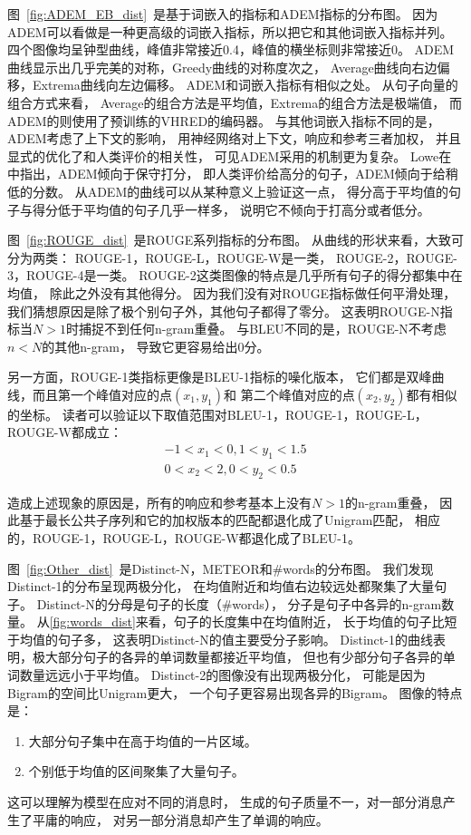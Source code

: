 
图~\ref{fig:ADEM_EB_dist}~是基于词嵌入的指标和ADEM指标的分布图。
因为ADEM可以看做是一种更高级的词嵌入指标，所以把它和其他词嵌入指标并列。
四个图像均呈钟型曲线，峰值非常接近0.4，峰值的横坐标则非常接近0。
ADEM曲线显示出几乎完美的对称，Greedy曲线的对称度次之，
Average曲线向右边偏移，Extrema曲线向左边偏移。
ADEM和词嵌入指标有相似之处。
从句子向量的组合方式来看，
Average的组合方法是平均值，Extrema的组合方法是极端值，
而ADEM的则使用了预训练的VHRED的编码器。
与其他词嵌入指标不同的是，ADEM考虑了上下文的影响，
用神经网络对上下文，响应和参考三者加权，
并且显式的优化了和人类评价的相关性，
可见ADEM采用的机制更为复杂。
Lowe在\cite{ADEM}中指出，ADEM倾向于保守打分，
即人类评价给高分的句子，ADEM倾向于给稍低的分数。
从ADEM的曲线可以从某种意义上验证这一点，
得分高于平均值的句子与得分低于平均值的句子几乎一样多，
说明它不倾向于打高分或者低分。


图~\ref{fig:ROUGE_dist}~是ROUGE系列指标的分布图。
从曲线的形状来看，大致可分为两类：
ROUGE-1，ROUGE-L，ROUGE-W是一类，
ROUGE-2，ROUGE-3，ROUGE-4是一类。
ROUGE-2这类图像的特点是几乎所有句子的得分都集中在均值，
除此之外没有其他得分。
因为我们没有对ROUGE指标做任何平滑处理，
我们猜想原因是除了极个别句子外，其他句子都得了零分。
这表明ROUGE-N指标当$N > 1$时捕捉不到任何n-gram重叠。
与BLEU不同的是，ROUGE-N不考虑$n < N$的其他n-gram，
导致它更容易给出0分。

另一方面，ROUGE-1类指标更像是BLEU-1指标的噪化版本，
它们都是双峰曲线，而且第一个峰值对应的点$(x_1, y_1)$和
第二个峰值对应的点$(x_2, y_2)$都有相似的坐标。
读者可以验证以下取值范围对BLEU-1，ROUGE-1，ROUGE-L，ROUGE-W都成立：
\begin{align}
    -1 < x_1 < 0, 1 < y_1 < 1.5 \\
    0 < x_2 < 2, 0 < y_2 < 0.5
\end{align}

造成上述现象的原因是，所有的响应和参考基本上没有$N > 1$的n-gram重叠，
因此基于最长公共子序列和它的加权版本的匹配都退化成了Unigram匹配，
相应的，ROUGE-1，ROUGE-L，ROUGE-W都退化成了BLEU-1。


图~\ref{fig:Other_dist}~是Distinct-N，METEOR和\#words的分布图。
我们发现Distinct-1的分布呈现两极分化，
在均值附近和均值右边较远处都聚集了大量句子。
Distinct-N的分母是句子的长度（\#words），
分子是句子中各异的n-gram数量。
从\ref{fig:words_dist}来看，句子的长度集中在均值附近，
长于均值的句子比短于均值的句子多，
这表明Distinct-N的值主要受分子影响。
Distinct-1的曲线表明，极大部分句子的各异的单词数量都接近平均值，
但也有少部分句子各异的单词数量远远小于平均值。
Distinct-2的图像没有出现两极分化，
可能是因为Bigram的空间比Unigram更大，
一个句子更容易出现各异的Bigram。
图像的特点是：
\begin{enumerate}
    \item 大部分句子集中在高于均值的一片区域。
    \item 个别低于均值的区间聚集了大量句子。
\end{enumerate}
这可以理解为模型在应对不同的消息时，
生成的句子质量不一，对一部分消息产生了平庸的响应，
对另一部分消息却产生了单调的响应。

